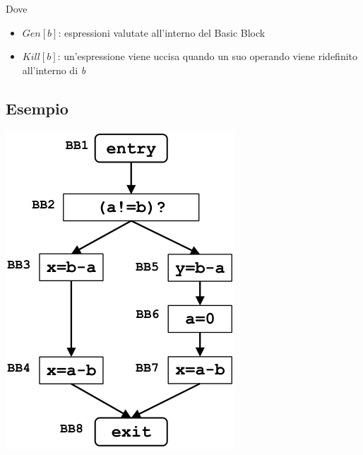 \documentclass[10pt,a4paper]{article}
\begin{document}
Dove
\begin{itemize}
  \item $Gen[b]$: espressioni valutate all'interno del Basic Block
  \item $Kill[b]$: un'espressione viene uccisa quando un suo operando viene ridefinito all'interno di \textit{b}
\end{itemize}

\subsection{Esempio}

\begin{minipage}[c]{.25\textwidth}
  \includegraphics[width=\textwidth]{example-1.png}
\end{minipage}
\end{document}
